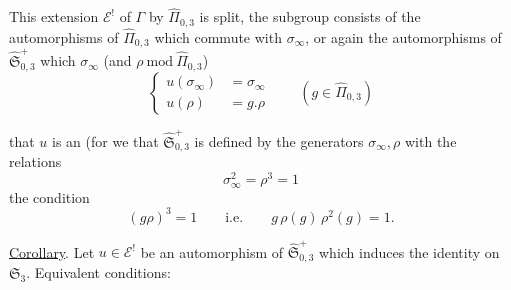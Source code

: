 
This extension $\mathcal E^{!}$ of $\Gamma$ by $\widehat{\Pi}_{0,3}$ is
split, the  subgroup consists
of the automorphisms of $\widehat{\Pi}_{0,3}$ which commute with $\sigma_\infty$,
or again the automorphisms of $\widehat{\mathfrak S}_{0,3}^{+}$ which
  $\sigma_\infty$ (and  $\rho\ \mathrm{mod}\ \widehat{\Pi}_{0,3}$)
\[
\left\{
\begin{aligned}
u(\sigma_\infty)&=\sigma_\infty\\
u(\rho)&=g.\rho
\end{aligned}
\right.
\qquad(g\in\widehat{\Pi}_{0,3})
\tag{36}
\]


 that $u$ is an  (for we 
that $\widehat{\mathfrak S}_{0,3}^{+}$ is defined by the generators $\sigma_\infty,\rho$
with the relations
\begin{equation}
\sigma_\infty^2=\rho^3=1
\tag{37}
\end{equation}
 the condition
\begin{equation}
(g\rho)^3=1\qquad\text{i.e.}\qquad g\,\rho(g)\,\rho^2(g)=1.
\tag{38}
\end{equation}


\uline{Corollary}. Let $u\in\mathcal E^{!}$ be an automorphism of
$\widehat{\mathfrak S}_{0,3}^{+}$ which induces the identity on $\mathfrak S_3$.
Equivalent conditions:

